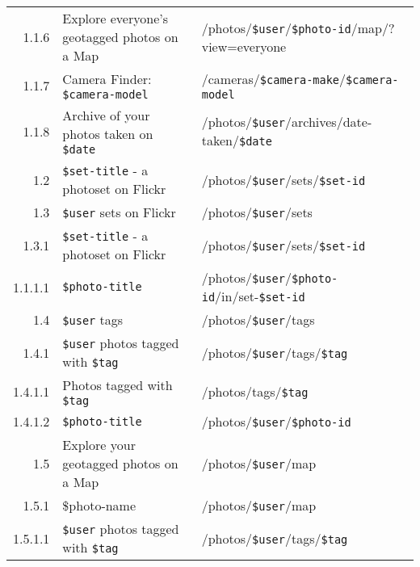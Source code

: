 \documentclass[11pt,a4paper]{article}
\newcommand{\var}[1]{\texttt{\${#1}}}
\begin{document}
\begin{center}
\begin{small}
\begin{longtable}{rp{5cm}l}
          1.1.6 &
          Explore everyone's geotagged photos on a Map &
          /photos/\var{user}/\var{photo-id}/map/?view=everyone \\

          1.1.7 &
          Camera Finder: \var{camera-model} &
          /cameras/\var{camera-make}/\var{camera-model} \\

          1.1.8 &
          Archive of your photos taken on \var{date} &
          /photos/\var{user}/archives/date-taken/\var{date} \\

        1.2 &
        \var{set-title} - a photoset on Flickr &
        /photos/\var{user}/sets/\var{set-id} \\

        1.3 &
        \var{user} sets on Flickr &
        /photos/\var{user}/sets \\

          1.3.1 &
          \var{set-title} - a photoset on Flickr &
          /photos/\var{user}/sets/\var{set-id} \\

            1.1.1.1 &
            \var{photo-title} &
            /photos/\var{user}/\var{photo-id}/in/set-\var{set-id} \\

        1.4 &
        \var{user} tags &
        /photos/\var{user}/tags \\

          1.4.1 &
          \var{user} photos tagged with \var{tag} &
          /photos/\var{user}/tags/\var{tag} \\

            1.4.1.1 &
            Photos tagged with \var{tag} &
            /photos/tags/\var{tag} \\

            1.4.1.2 &
            \var{photo-title} &
            /photos/\var{user}/\var{photo-id} \\


        1.5 &
        Explore your geotagged photos on a Map &
        /photos/\var{user}/map \\

          1.5.1 &
          \$photo-name &
          /photos/\var{user}/map \\

            1.5.1.1 &
            \var{user} photos tagged with \var{tag} &
            /photos/\var{user}/tags/\var{tag} \\


\end{longtable}
\end{small}
\end{center}
\end{document}
